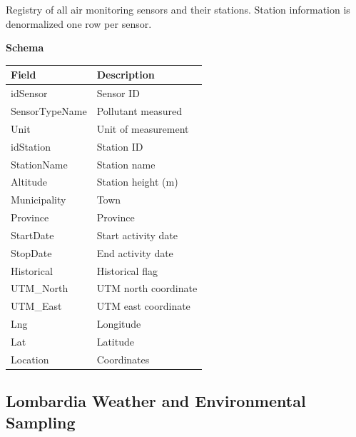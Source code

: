 \documentclass{article}
\begin{document}
	Registry of all air monitoring sensors and their stations. Station information is denormalized one row per sensor.

	\textbf{Schema}
		
	\begin{table}[H]
		\centering
		\begin{tabular}{ll}
			\hline
			Field & Description \\
			\hline
			idSensor & Sensor ID \\
			SensorTypeName & Pollutant measured \\
			Unit & Unit of measurement \\
			idStation & Station ID \\
			StationName & Station name \\
			Altitude & Station height (m) \\
			Municipality & Town \\
			Province & Province \\
			StartDate & Start activity date \\
			StopDate & End activity date \\
			Historical & Historical flag \\
			UTM\_North & UTM north coordinate \\
			UTM\_East & UTM east coordinate \\
			Lng & Longitude \\
			Lat & Latitude \\
			Location & Coordinates \\
			\hline
		\end{tabular}
	\end{table}
	
	\subsection{Lombardia Weather and Environmental Sampling}
	
\end{document}
